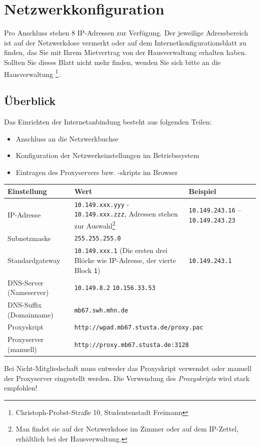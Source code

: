 \documentclass[a4paper,12pt]{scrartcl}
\begin{document}
\newpage

\section*{Netzwerkkonfiguration}

Pro Anschluss stehen 8 IP-Adressen zur Verfügung. Der jeweilige Adressbereich ist auf der Netzwerkdose vermerkt oder auf dem Internetkonfigurationsblatt zu finden, das Sie mit Ihrem Mietvertrag von der Hausverwaltung erhalten haben. Sollten Sie dieses Blatt nicht mehr finden, wenden Sie sich bitte an die Hausverwaltung \footnote{Christoph-Probst-Straße 10, Studentenstadt Freimann}.

\subsection*{Überblick}

Das Einrichten der Internetanbindung besteht aus folgenden Teilen:
\begin{itemize}
    \item Anschluss an die Netzwerkbuchse
    \item Konfiguration der Netzwerkeinstellungen im Betriebssystem
    \item Eintragen des Proxyservers bzw. -skripts im Browser
\end{itemize}


\begin{center}
  \begin{tabularx}{\linewidth}{|lXp{.2\linewidth}|}
    \hline
    Einstellung & Wert & Beispiel \\
    \hline \hline
    IP-Adresse & \nolinkurl{10.149.xxx.yyy} - \nolinkurl{10.149.xxx.zzz}, \newline 8 Adressen stehen zur Auswahl\footnote{Man findet sie auf der Netzwerkdose im Zimmer oder auf dem IP-Zettel, erhältlich bei der Hausverwaltung.} & \nolinkurl{10.149.243.16} – \nolinkurl{10.149.243.23} \\
    \hline
    Subnetzmaske & \nolinkurl{255.255.255.0} & \\
    \hline
    Standardgateway & \nolinkurl{10.149.xxx.1} \newline (Die ersten drei Blöcke wie IP-Adresse, der vierte Block \nolinkurl{1}) & \nolinkurl{10.149.243.1} \\
    \hline
		  DNS-Server (Nameserver) & \nolinkurl{10.149.8.2} \newline \nolinkurl{10.156.33.53}& \\
    \hline
    DNS-Suffix (Domainname) & \nolinkurl{mb67.swh.mhn.de} & \\
    \hline
    Proxyskript & \multicolumn{2}{l|}{\nolinkurl{http://wpad.mb67.stusta.de/proxy.pac}} \\
    \hline
    Proxyserver (manuell) & \multicolumn{2}{l|}{\nolinkurl{http://proxy.mb67.stusta.de:3128}} \\
    \hline
  \end{tabularx}
\end{center}
Bei Nicht-Mitgliedschaft muss entweder das Proxyskript verwendet oder manuell der Proxyserver eingestellt werden. Die Verwendung des \emph{Proxyskripts} wird stark empfohlen!
\end{document}
